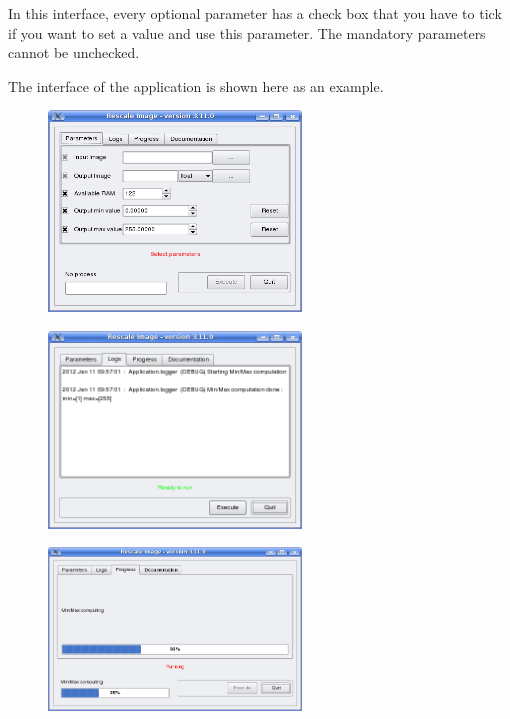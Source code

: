 In this interface, every optional parameter has a check box that
you have to tick if you want to set a value and use this parameter.
The mandatory parameters cannot be unchecked.

The interface of the application  is shown
here as an example.

\begin{figure}[h]
  \center
  \includegraphics[width=0.6\textwidth]{../Art/QtImages/rescale_param.png}
  \label{fig:rescaleParam}
\end{figure}

\begin{figure}[h]
  \center
  \includegraphics[width=0.6\textwidth]{../Art/QtImages/rescale_logs.png}
  \label{fig:rescaleLogs}
\end{figure}

\begin{figure}[h]
  \center
  \includegraphics[width=0.6\textwidth]{../Art/QtImages/rescale_progress.png}
  \label{fig:rescaleProgress}
\end{figure}

